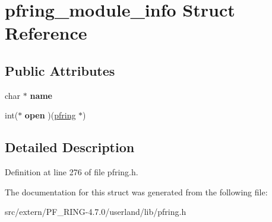 \hypertarget{structpfring__module__info}{
\section{pfring\_\-module\_\-info Struct Reference}
\label{structpfring__module__info}
}
\subsection*{Public Attributes}
\begin{DoxyCompactItemize}
\item 
\hypertarget{structpfring__module__info_abf193fecf3dfbedb3ba727894305f7f5}{
char $\ast$ {\bfseries name}}
\label{structpfring__module__info_abf193fecf3dfbedb3ba727894305f7f5}

\item 
\hypertarget{structpfring__module__info_a0e506638a6f7e1813e526958c7926d60}{
int($\ast$ {\bfseries open} )(\hyperlink{struct____pfring}{pfring} $\ast$)}
\label{structpfring__module__info_a0e506638a6f7e1813e526958c7926d60}

\end{DoxyCompactItemize}


\subsection{Detailed Description}


Definition at line 276 of file pfring.h.



The documentation for this struct was generated from the following file:\begin{DoxyCompactItemize}
\item 
src/extern/PF\_\-RING-\/4.7.0/userland/lib/pfring.h\end{DoxyCompactItemize}
